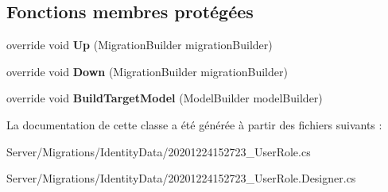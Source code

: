 \subsection*{Fonctions membres protégées}
\begin{DoxyCompactItemize}
\item 
\mbox{\label{class_mediwatch_1_1_server_1_1_migrations_1_1_identity_data_1_1_user_role_a8ccaaaabfb6492822c891a222ea9146e}} 
override void {\bfseries Up} (Migration\+Builder migration\+Builder)
\item 
\mbox{\label{class_mediwatch_1_1_server_1_1_migrations_1_1_identity_data_1_1_user_role_a37c0913be87d41042398bbc9127e7300}} 
override void {\bfseries Down} (Migration\+Builder migration\+Builder)
\item 
\mbox{\label{class_mediwatch_1_1_server_1_1_migrations_1_1_identity_data_1_1_user_role_a43904c2791341bd27330059634f3a01b}} 
override void {\bfseries Build\+Target\+Model} (Model\+Builder model\+Builder)
\end{DoxyCompactItemize}


La documentation de cette classe a été générée à partir des fichiers suivants \+:\begin{DoxyCompactItemize}
\item 
Server/\+Migrations/\+Identity\+Data/20201224152723\+\_\+\+User\+Role.\+cs\item 
Server/\+Migrations/\+Identity\+Data/20201224152723\+\_\+\+User\+Role.\+Designer.\+cs\end{DoxyCompactItemize}
